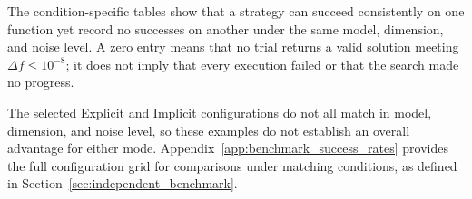 \FloatBarrier

The condition-specific tables show that a strategy can succeed
consistently on one function yet record no successes on another
under the same model, dimension, and noise level. A zero entry
means that no trial returns a valid solution meeting
$\Delta f\leq10^{-8}$; it does not imply that every execution
failed or that the search made no progress.

The selected Explicit and Implicit configurations do not all match
in model, dimension, and noise level, so these examples do not
establish an overall advantage for either mode.
Appendix~\ref{app:benchmark_success_rates} provides the full
configuration grid for comparisons under matching conditions,
as defined in Section~\ref{sec:independent_benchmark}.

\FloatBarrier



